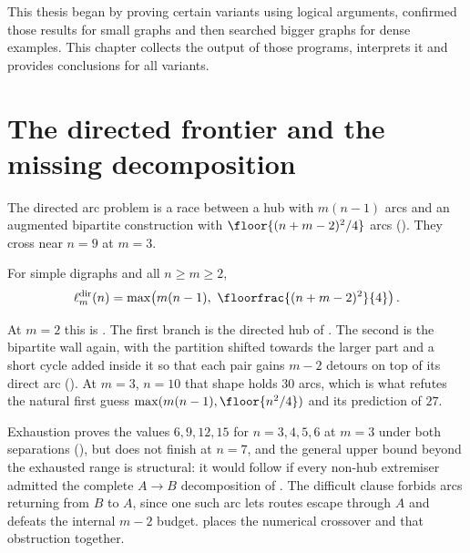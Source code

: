 This thesis began by proving certain variants using logical arguments,
confirmed those results for small graphs and then searched bigger graphs for dense examples.
This chapter collects the output of those programs, interprets it and provides conclusions for all variants.

\section{The directed frontier and the missing decomposition}
The directed arc problem is a race between a hub with $m(n-1)$ arcs and 
an augmented bipartite construction with $\floor{(n+m-2)^2/4}$ arcs 
(). They cross near $n=9$ at $m=3$.

\begin{conjecture}\label{conj:dir-arc}
For simple digraphs and all $n \ge m \ge 2$,
\[
    \ell_m^{\mathrm{dir}}(n) = \max\!\left(m(n-1),\ \floorfrac{(n+m-2)^2}{4}\right).
\]
\end{conjecture}

At $m = 2$ this is . The first branch is the directed hub of . The second is the bipartite wall again, with the partition shifted towards the larger part and a short cycle added inside it so that each pair gains $m-2$ detours on top of its direct arc (). At $m = 3$, $n = 10$ that shape holds $30$ arcs, which is what refutes the natural first guess $\max(m(n-1), \floor{n^2/4})$ and its prediction of $27$.

Exhaustion proves the values $6,9,12,15$ for $n=3,4,5,6$ at $m=3$ under both separations (), but does not finish at $n=7$, and the general upper bound beyond the exhausted range is structural: it would follow if every non-hub extremiser admitted the complete $A\to B$ decomposition of . The difficult clause forbids arcs returning from $B$ to $A$, since one such arc lets routes escape through $A$ and defeats the internal $m-2$ budget.  places the numerical crossover and that obstruction together.

